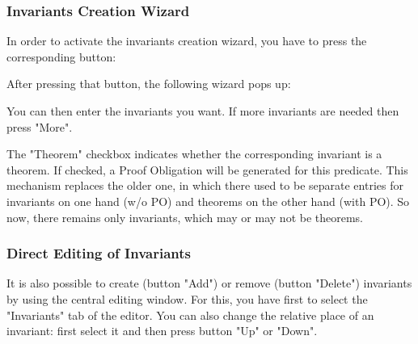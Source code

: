 \subsubsection{Invariants Creation Wizard}

In order to activate the invariants creation wizard, you have to press the corresponding button:


After pressing that button, the following wizard pops up: 


You can then enter the invariants you want. If more invariants are needed then press "More".

The "Theorem" checkbox indicates whether the corresponding invariant is a theorem. If checked, a Proof Obligation will be generated for this predicate. This mechanism replaces the older one, in which there used to be separate entries for invariants on one hand (w/o PO) and theorems on the other hand (with PO). So now, there remains only invariants, which may or may not be theorems.

\subsubsection{Direct Editing of Invariants}

It is also possible to create (button "Add") or remove (button "Delete") invariants by using the central editing window. For this, you have first to select the "Invariants" tab of the editor. You can also change the relative place of an invariant: first select it and then press button "Up" or "Down". 


